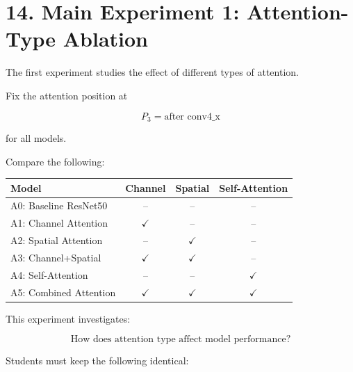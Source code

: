 \documentclass[10pt]{article}
\begin{document}
\section*{14. Main Experiment 1: Attention-Type Ablation}

The first experiment studies the effect of different types of attention.

Fix the attention position at

\[
\boxed{
P_3=\text{after conv4\_x}
}
\]

for all models.

Compare the following:

\begin{center}

\begin{tabular}{|l|c|c|c|}
\hline

\textbf{Model}
&
\textbf{Channel}
&
\textbf{Spatial}
&
\textbf{Self-Attention}
\\
\hline

A0: Baseline ResNet50
&
--
&
--
&
--
\\
\hline

A1: Channel Attention
&
$\checkmark$
&
--
&
--
\\
\hline

A2: Spatial Attention
&
--
&
$\checkmark$
&
--
\\
\hline

A3: Channel+Spatial
&
$\checkmark$
&
$\checkmark$
&
--
\\
\hline

A4: Self-Attention
&
--
&
--
&
$\checkmark$
\\
\hline

A5: Combined Attention
&
$\checkmark$
&
$\checkmark$
&
$\checkmark$
\\
\hline

\end{tabular}

\end{center}

This experiment investigates:

\[
\boxed{
\text{How does attention type affect model performance?}
}
\]

Students must keep the following identical:
\end{document}
